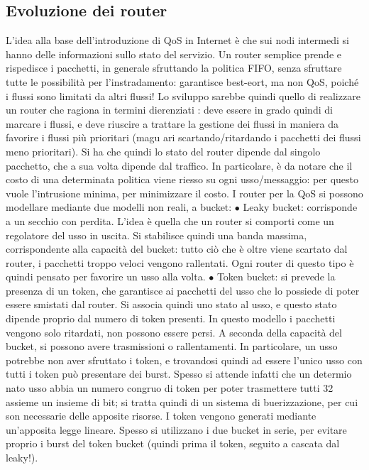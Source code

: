 \subsection{Evoluzione dei router}
L'idea alla base dell'introduzione di QoS in Internet è che sui nodi intermedi si
hanno delle informazioni sullo stato del servizio. Un router semplice prende e
rispedisce i pacchetti, in generale sfruttando la politica FIFO, senza sfruttare
tutte le possibilità per l'instradamento: garantisce best-eort, ma non QoS,
poiché i flussi sono limitati da altri flussi!
Lo sviluppo sarebbe quindi quello di realizzare un router che ragiona in termini dierenziati : deve essere in grado
quindi di marcare i flussi, e deve riuscire
a trattare la gestione dei flussi in maniera da favorire i flussi più prioritari (magu
ari scartando/ritardando i pacchetti dei flussi meno prioritari). Si ha che quindi
lo stato del router dipende dal singolo pacchetto, che a sua volta dipende dal
traffico. In particolare, è da notare che il costo di una determinata politica
viene riesso su ogni usso/messaggio: per questo vuole l'intrusione minima,
per minimizzare il costo.
I router per la QoS si possono modellare mediante due modelli non reali, a
bucket:
$\bullet$ Leaky bucket: corrisponde a un secchio con perdita. L'idea è quella che
un router si comporti come un regolatore del usso in uscita. Si stabilisce
quindi una banda massima, corrispondente alla capacità del bucket: tutto
ciò che è oltre viene scartato dal router, i pacchetti troppo veloci vengono
rallentati. Ogni router di questo tipo è quindi pensato per favorire un
usso alla volta.
$\bullet$ Token bucket: si prevede la presenza di un token, che garantisce ai pacchetti del usso che lo possiede di
poter essere smistati dal router. Si associa
quindi uno stato al usso, e questo stato dipende proprio dal numero di
token presenti. In questo modello i pacchetti vengono solo ritardati, non
possono essere persi. A seconda della capacità del bucket, si possono avere
trasmissioni o rallentamenti. In particolare, un usso potrebbe non aver
sfruttato i token, e trovandosi quindi ad essere l'unico usso con tutti i
token può presentare dei burst. Spesso si attende infatti che un determio
nato usso abbia un numero congruo di token per poter trasmettere tutti
32
assieme un insieme di bit; si tratta quindi di un sistema di buerizzazione,
per cui son necessarie delle apposite risorse. I token vengono generati
mediante un'apposita legge lineare.
Spesso si utilizzano i due bucket in serie, per evitare proprio i burst del token
bucket (quindi prima il token, seguito a cascata dal leaky!).
